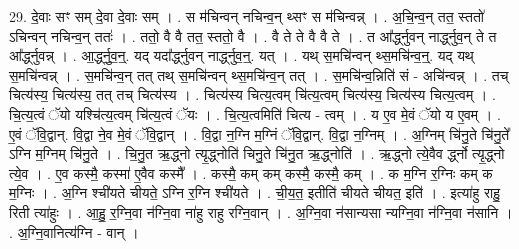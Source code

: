 \documentclass[17pt]{extarticle}
\begin{document}
29. दे॒वाः सꣳ सम् दे॒वा दे॒वाः सम् । . स म॑चिन्वन् नचिन्व॒न् थ्सꣳ स म॑चिन्वन्न् । . अ॒चि॒न्व॒न् तत॒ स्ततो॑ ऽचिन्वन् नचिन्व॒न् ततः॑ । . ततो॒ वै वै तत॒ स्ततो॒ वै । . वै ते ते वै वै ते । . त आ᳚र्द्ध्नुवन् नार्द्ध्नुव॒न् ते त आ᳚र्द्ध्नुवन्न् । . आ॒र्द्ध्नु॒व॒न्॒. यद् यदा᳚र्द्ध्नुवन् नार्द्ध्नुव॒न्॒. यत् । . यथ् स॒मचि॑न्वन् थ्स॒मचि॑न्व॒न्॒. यद् यथ् स॒मचि॑न्वन्न् । . स॒मचि॑न्व॒न् तत् तथ् स॒मचि॑न्वन् थ्स॒मचि॑न्व॒न् तत् । . स॒मचि॑न्व॒न्निति॑ सं - अचि॑न्वन्न् । . तच् चित्य॑स्य॒ चित्य॑स्य॒ तत् तच् चित्य॑स्य । . चित्य॑स्य चित्य॒त्वम् चि॑त्य॒त्वम् चित्य॑स्य॒ चित्य॑स्य चित्य॒त्वम् । . चि॒त्य॒त्वं ॅयो यश्चि॑त्य॒त्वम् चि॑त्य॒त्वं ॅयः । . चि॒त्य॒त्वमिति॑ चित्य - त्वम् । . य ए॒व मे॒वं ॅयो य ए॒वम् । . ए॒वं ॅवि॒द्वान्. वि॒द्वा ने॒व मे॒वं ॅवि॒द्वान् । . वि॒द्वा न॒ग्नि म॒ग्निं ॅवि॒द्वान्. वि॒द्वा न॒ग्निम् । . अ॒ग्निम् चि॑नु॒ते चि॑नु॒ते᳚ ऽग्नि म॒ग्निम् चि॑नु॒ते । . चि॒नु॒त ऋ॒द्ध्नो त्यृ॒द्ध्नोति॑ चिनु॒ते चि॑नु॒त ऋ॒द्ध्नोति॑ । . ऋ॒द्ध्नो त्ये॒वैव र्द्ध्नो त्यृ॒द्ध्नो त्ये॒व । . ए॒व कस्मै॒ कस्मा॑ ए॒वैव कस्मै᳚ । . कस्मै॒ कम् कम् कस्मै॒ कस्मै॒ कम् । . क म॒ग्नि र॒ग्निः कम् क म॒ग्निः । . अ॒ग्नि श्ची॑यते चीयते॒ ऽग्नि र॒ग्नि श्ची॑यते । . ची॒य॒त॒ इतीति॑ चीयते चीयत॒ इति॑ । . इत्या॑हु राहु॒ रिती त्या॑हुः । . आ॒हु॒ र॒ग्नि॒वा न॑ग्नि॒वा ना॑हु राहु रग्नि॒वान् । . अ॒ग्नि॒वा न॑सान्यसा न्यग्नि॒वा न॑ग्नि॒वा न॑सानि । . अ॒ग्नि॒वानित्य॑ग्नि - वान् । \newline
\end{document}
